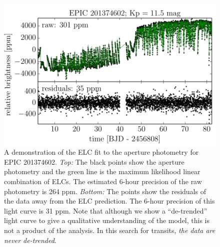 \begin{figure}[p]
\begin{center}
\includegraphics{figures/ketu/corr.pdf}
\end{center}
\caption{%
A demonstration of the ELC fit to the aperture photometry for EPIC 201374602.
\emph{Top:} The black points show the aperture photometry and the green line
is the maximum likelihood linear combination of ELCs.
The estimated 6-hour precision of the raw photometry is 264 ppm.
\emph{Bottom:} The points show the residuals of the data away from the ELC
prediction.
The 6-hour precision of this light curve is 31 ppm.
Note that although we show a ``de-trended'' light curve to give a qualitative
understanding of the model, this is not a product of the analysis.
In this search for transits, \emph{the data are never de-trended}.
}
\end{figure}

